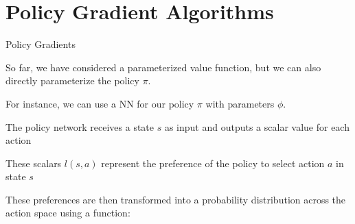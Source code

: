 \section{Policy Gradient Algorithms}

\begin{frame}[t]{Policy Gradients}

So far, we have considered a parameterized value function, but we can also directly parameterize the policy $\pi$.

\blist
    \item For instance, we can use a NN for our policy $\pi$ with parameters $\phi$. 
    \item The policy network receives a state $s$ as input and outputs a scalar value for each action
    \item These scalars $l(s, a)$ represent the preference of the policy to select action $a$ in state $s$
    \item<2-> These preferences are then transformed into a probability distribution across the action space using a  function:
\elist

\vspace{-1em}

    
\end{frame}

